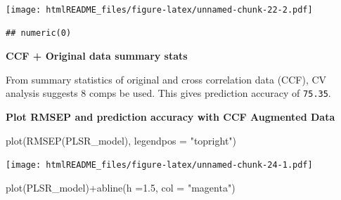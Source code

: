 \documentclass[
]{article}
\newenvironment{Shaded}{\begin{snugshade}}{\end{snugshade}}
\newcommand{\AttributeTok}[1]{\textcolor[rgb]{0.77,0.63,0.00}{#1}}
\newcommand{\CommentTok}[1]{\textcolor[rgb]{0.56,0.35,0.01}{\textit{#1}}}
\newcommand{\ConstantTok}[1]{\textcolor[rgb]{0.00,0.00,0.00}{#1}}
\newcommand{\FloatTok}[1]{\textcolor[rgb]{0.00,0.00,0.81}{#1}}
\newcommand{\FunctionTok}[1]{\textcolor[rgb]{0.00,0.00,0.00}{#1}}
\newcommand{\NormalTok}[1]{#1}
\newcommand{\OtherTok}[1]{\textcolor[rgb]{0.56,0.35,0.01}{#1}}
\newcommand{\SpecialCharTok}[1]{\textcolor[rgb]{0.00,0.00,0.00}{#1}}
\newcommand{\StringTok}[1]{\textcolor[rgb]{0.31,0.60,0.02}{#1}}
\begin{document}
\texttt{[image: htmlREADME\_files/figure-latex/unnamed-chunk-22-2.pdf]}

\begin{verbatim}
## numeric(0)
\end{verbatim}

\textbf{CCF + Original data summary stats}

From summary statistics of original and cross correlation data (CCF), CV
analysis suggests 8 comps be used. This gives prediction accuracy of
\texttt{75.35}.

\begin{Shaded}
\end{Shaded}

\textbf{Plot RMSEP and prediction accuracy with CCF Augmented Data}

\begin{Shaded}
\begin{Highlighting}[]
\FunctionTok{plot}\NormalTok{(}\FunctionTok{RMSEP}\NormalTok{(PLSR\_model), }\AttributeTok{legendpos =} \StringTok{"topright"}\NormalTok{)}
\end{Highlighting}
\end{Shaded}

\texttt{[image: htmlREADME\_files/figure-latex/unnamed-chunk-24-1.pdf]}

\begin{Shaded}
\begin{Highlighting}[]
\FunctionTok{plot}\NormalTok{(PLSR\_model)}\SpecialCharTok{+}\FunctionTok{abline}\NormalTok{(}\AttributeTok{h =}\FloatTok{1.5}\NormalTok{, }\AttributeTok{col =} \StringTok{"magenta"}\NormalTok{)}
\end{Highlighting}
\end{Shaded}
\end{document}
